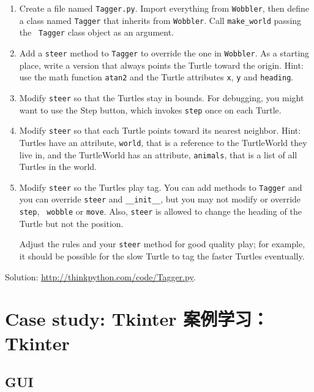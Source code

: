 \documentclass[10pt]{book}
\begin{document}
\begin{CJK}{UTF8}{gbsn}
\begin{exercise}
\begin{enumerate}
\item Create a file named {\tt Tagger.py}.  Import everything from
  {\tt Wobbler}, then define a class named {\tt Tagger} that inherits
  from {\tt Wobbler}.  Call \verb"make_world" passing the {\tt
    Tagger} class object as an argument.

\item Add a {\tt steer} method to {\tt Tagger} to override the one in
  {\tt Wobbler}.  As a starting place, write a version that always
  points the Turtle toward the origin.  Hint: use the math function
  {\tt atan2} and the Turtle attributes {\tt x}, {\tt y} and
  {\tt heading}.

\item Modify {\tt steer} so that the Turtles stay in bounds.
  For debugging, you might want to use the {\sf Step} button,
  which invokes {\tt step} once on each Turtle.

\item Modify {\tt steer} so that each Turtle points toward its nearest
  neighbor.  Hint: Turtles have an attribute, {\tt world}, that is a
  reference to the TurtleWorld they live in, and the TurtleWorld has
  an attribute, {\tt animals}, that is a list of all Turtles in the
  world.

\item Modify {\tt steer} so the Turtles play tag.  You can add methods
  to {\tt Tagger} and you can override {\tt steer} and
  \verb"__init__", but you may not modify or override {\tt step}, {\tt
    wobble} or {\tt move}.  Also, {\tt steer} is allowed to change the
  heading of the Turtle but not the position.

Adjust the rules and your {\tt steer} method for good quality play;
for example, it should be possible for the slow Turtle to tag the
faster Turtles eventually.

\end{enumerate}

Solution: \url{http://thinkpython.com/code/Tagger.py}.
\end{exercise}



\chapter{Case study: Tkinter  案例学习：Tkinter}
\label{tkinter}

\section{GUI}


\end{CJK}
\end{document}
